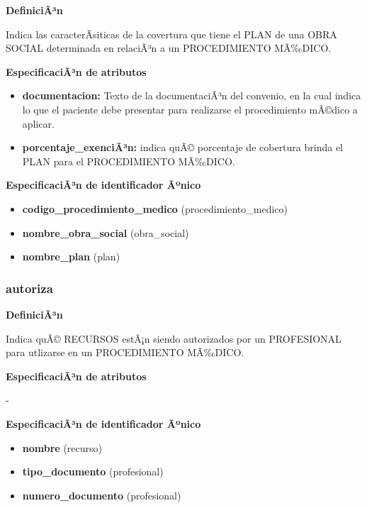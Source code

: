 \documentclass[a4paper,11pt]{article}
\begin{document}
\textbf{DefiniciÃ³n}

Indica las caracterÃ­siticas de la covertura que tiene el PLAN de una 
OBRA SOCIAL determinada en relaciÃ³n a un PROCEDIMIENTO MÃ‰DICO.

\textbf{EspecificaciÃ³n de atributos}

\begin{itemize}

     \item \textbf{documentacion:} Texto de la documentaciÃ³n del convenio, en la cual 
     indica lo que el paciente debe presentar para realizarse el procedimiento mÃ©dico 
     a aplicar.

     \item \textbf{porcentaje\_exenciÃ³n:} indica quÃ© porcentaje de cobertura brinda
     el PLAN para el PROCEDIMIENTO MÃ‰DICO.

\end{itemize}

\textbf{EspecificaciÃ³n de identificador Ãºnico}

\begin{itemize}

     \item \textbf{codigo\_procedimiento\_medico} (procedimiento\_medico)

     \item \textbf{nombre\_obra\_social} (obra\_social)

     \item \textbf{nombre\_plan} (plan)

\end{itemize}

\subsubsection{\textbf{autoriza}}

\textbf{DefiniciÃ³n}

Indica quÃ© RECURSOS estÃ¡n siendo autorizados por un PROFESIONAL para utlizarse en 
un PROCEDIMIENTO MÃ‰DICO.

\textbf{EspecificaciÃ³n de atributos}

-

\textbf{EspecificaciÃ³n de identificador Ãºnico}

\begin{itemize}

     \item \textbf{nombre} (recurso)

     \item \textbf{tipo\_documento} (profesional)

     \item \textbf{numero\_documento} (profesional)

\end{itemize}
\end{document}
